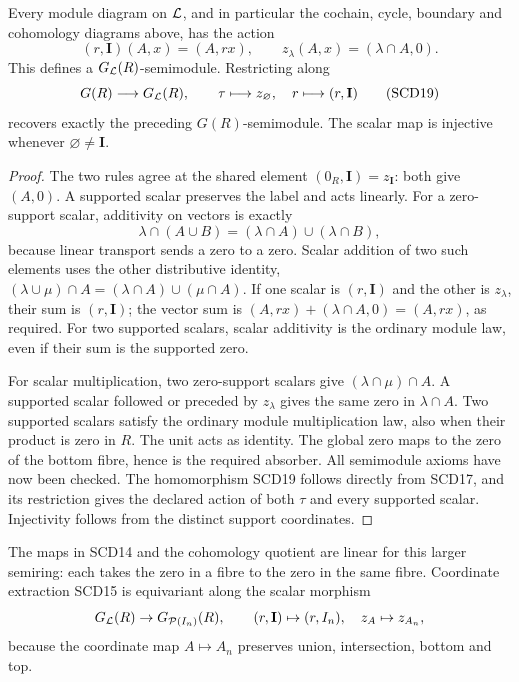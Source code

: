 \begin{theorem}
Every module diagram on \(\mathcal L\), and in particular the cochain,
cycle, boundary and cohomology diagrams above, has the action
\[
 (r,\mathbf I)(A,x)=(A,rx),\qquad
 z_\lambda(A,x)=(\lambda\cap A,0).
 \tag{SCD18}
\]
This defines a \(G_{\mathcal L}(R)\)-semimodule. Restricting along
\[
 G(R)\longrightarrow G_{\mathcal L}(R),\qquad
 \tau\longmapsto z_\varnothing,\quad
 r\longmapsto(r,\mathbf I)
 \tag{SCD19}
\]
recovers exactly the preceding \(G(R)\)-semimodule.
The scalar map is injective whenever \(\varnothing\ne\mathbf I\).
\end{theorem}
\begin{proof}
The two rules agree at the shared element
\((0_R,\mathbf I)=z_{\mathbf I}\): both give \((A,0)\).
A supported scalar preserves the label and acts linearly. For a
zero-support scalar, additivity on vectors is exactly
\[
 \lambda\cap(A\cup B)=(\lambda\cap A)\cup(\lambda\cap B),
\]
because linear transport sends a zero to a zero. Scalar addition
of two such elements uses the other distributive identity,
\((\lambda\cup\mu)\cap A=(\lambda\cap A)\cup(\mu\cap A)\).
If one scalar is \((r,\mathbf I)\) and the other is \(z_\lambda\),
their sum is \((r,\mathbf I)\); the vector sum is
\((A,rx)+(\lambda\cap A,0)=(A,rx)\), as required.
For two supported scalars, scalar additivity is the ordinary
module law, even if their sum is the supported zero.

For scalar multiplication, two zero-support scalars give
\((\lambda\cap\mu)\cap A\). A supported scalar followed or preceded
by \(z_\lambda\) gives the same zero in \(\lambda\cap A\).
Two supported scalars satisfy the ordinary module multiplication
law, also when their product is zero in \(R\).
The unit acts as identity. The global zero maps to the zero of
the bottom fibre, hence is the required absorber. All semimodule
axioms have now been checked. The homomorphism SCD19 follows
directly from SCD17, and its restriction gives the declared action
of both \(\tau\) and every supported scalar. Injectivity follows
from the distinct support coordinates.
\end{proof}

The maps in SCD14 and the cohomology quotient are linear for this
larger semiring: each takes the zero in a fibre to the zero in the
same fibre. Coordinate extraction SCD15 is equivariant along the
scalar morphism
\[
 G_{\mathcal L}(R)\to G_{\mathcal P(I_n)}(R),\qquad
 (r,\mathbf I)\mapsto(r,I_n),\quad z_A\mapsto z_{A_n},
\]
because the coordinate map \(A\mapsto A_n\) preserves union,
intersection, bottom and top.


